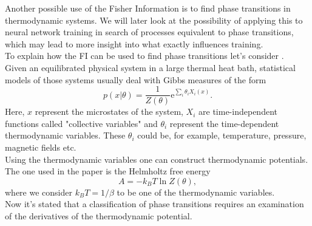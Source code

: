 Another possible use of the Fisher Information is to find phase transitions in thermodynamic systems. We will later look at the possibility of applying this to neural network training in search of processes equivalent to phase transitions, which may lead to more insight into what exactly influences training.\\
To explain how the FI can be used to find phase transitions let's consider \cite{Prokopenko}.\\
Given an equilibrated physical system in a large thermal heat bath, statistical models of those systems usually deal with Gibbs measures of the form 
\begin{equation}
	p(x|\theta) = \frac{1}{Z(\theta)} \mathrm{e}^{\sum_i \theta_i X_i(x)}.
\end{equation}
Here, $x$ represent the microstates of the system, $X_i$ are time-independent functions called "collective variables" and $\theta_i$ represent the time-dependent thermodynamic variables. These $\theta_i$ could be, for example, temperature, pressure, magnetic fields etc.\\
Using the thermodynamic variables one can construct thermodynamic potentials. The one used in the paper is the Helmholtz free energy 
\begin{equation}
	A = - k_B T \ln Z(\theta),
\end{equation}
where we consider $k_B T = 1/\beta$ to be one of the thermodynamic variables. \\
Now it's stated that a classification of phase transitions requires an examination of the derivatives of the thermodynamic potential. 